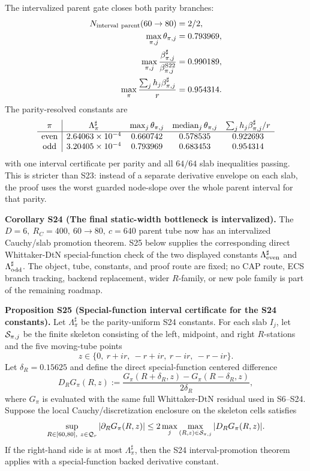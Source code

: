 \documentclass[aps,prd,onecolumn,notitlepage,nofootinbib,superscriptaddress,11pt,floatfix]{revtex4-2}
\begin{document}
The intervalized parent gate closes both parity branches:
\[
\begin{aligned}
N_{\rm interval\ parent}(60\to80)&=2/2,\\
\max_{\pi,j}\theta_{\pi,j}&=0.793969,\\
\max_{\pi,j}\frac{\beta^\sharp_{\pi,j}}{\beta^{\rm S22}_{\pi,j}}&=0.990189,\\
\max_\pi\frac{\sum_j h_j\beta^\sharp_{\pi,j}}{r}&=0.954314.
\end{aligned}
\]
The parity-resolved constants are
\[
\begin{array}{c|cccc}
\pi & \Lambda_\pi^\sharp &
\max_j\theta_{\pi,j} &
\operatorname{median}_j\theta_{\pi,j} &
\sum_j h_j\beta^\sharp_{\pi,j}/r\\
\hline
{\rm even} & 2.64063\times10^{-4} & 0.660742 & 0.578535 & 0.922693\\
{\rm odd}  & 3.20405\times10^{-4} & 0.793969 & 0.683453 & 0.954314
\end{array}
\]
with one interval certificate per parity and all \(64/64\) slab inequalities
passing.  This is stricter than S23: instead of a separate derivative envelope
on each slab, the proof uses the worst guarded node-slope over the whole
parent interval for that parity.

\medskip\noindent\textbf{Corollary S24 (The final static-width bottleneck is intervalized).}
The \(D=6,\ R_C=400,\ 60\to80,\ c=640\) parent tube now has an intervalized
Cauchy/slab promotion theorem.  S25 below supplies the corresponding direct
Whittaker-DtN special-function check of the two displayed constants
\(\Lambda^\sharp_{\rm even}\) and \(\Lambda^\sharp_{\rm odd}\).  The object,
tube, constants, and proof route are fixed; no CAP route, ECS branch tracking,
backend replacement, wider \(R\)-family, or new pole family is part of the
remaining roadmap.

\medskip\noindent\textbf{Proposition S25 (Special-function interval certificate for the S24 constants).}
Let \(\Lambda_\pi^\sharp\) be the parity-uniform S24 constants.  For each
slab \(I_j\), let \({\cal S}_{\pi,j}\) be the finite skeleton consisting of
the left, midpoint, and right \(R\)-stations and the five moving-tube points
\[
z\in\{0,\ r+ir,\ -r+ir,\ r-ir,\ -r-ir\}.
\]
Let \(\delta_R=0.15625\) and define the direct special-function centered
difference
\[
D_RG_\pi(R,z):=
\frac{G_\pi(R+\delta_R,z)-G_\pi(R-\delta_R,z)}{2\delta_R},
\]
where \(G_\pi\) is evaluated with the same full Whittaker-DtN residual used in
S6--S24.  Suppose the local Cauchy/discretization enclosure on the skeleton
cells satisfies
\[
\sup_{R\in[60,80],\ z\in{\cal Q}_r}|\partial_RG_\pi(R,z)|
\le
2\max_{j}\max_{(R,z)\in{\cal S}_{\pi,j}}|D_RG_\pi(R,z)|.
\]
If the right-hand side is at most \(\Lambda_\pi^\sharp\), then the S24
interval-promotion theorem applies with a special-function backed derivative
constant.
\end{document}
